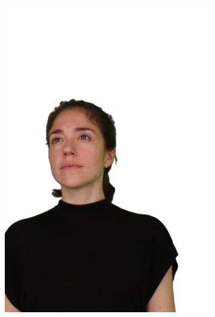 \begin{figure}[!ht]
\begin{subfigure}{0.12\linewidth}
        \includegraphics[width=\textwidth]{Figures/results/initials/irene/3_render.png}

\end{subfigure}
\end{figure}
